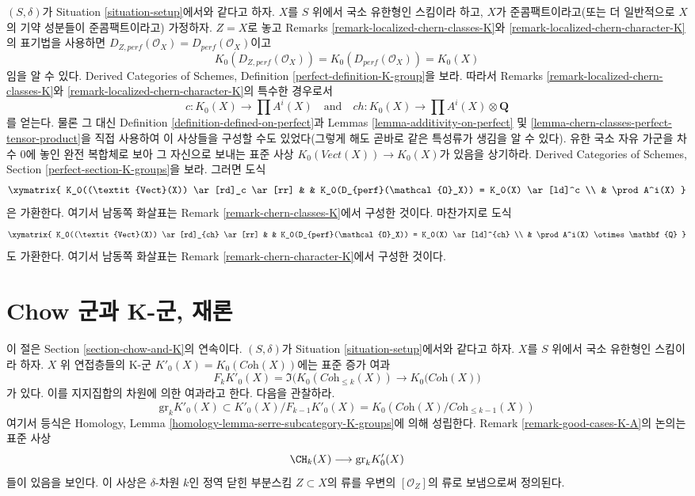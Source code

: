 \begin{remark}
\label{remark-chern-classes-agree}
$(S, \delta)$가 Situation \ref{situation-setup}에서와 같다고 하자.
$X$를 $S$ 위에서 국소 유한형인 스킴이라 하고, $X$가
준콤팩트이라고(또는 더 일반적으로 $X$의 기약 성분들이 준콤팩트이라고)
가정하자. $Z = X$로 놓고 Remarks
\ref{remark-localized-chern-classes-K}와
\ref{remark-localized-chern-character-K}의 표기법을 사용하면
$D_{Z, perf}(\mathcal{O}_X) = D_{perf}(\mathcal{O}_X)$이고
$$
K_0(D_{Z, perf}(\mathcal{O}_X)) = K_0(D_{perf}(\mathcal{O}_X)) = K_0(X)
$$
임을 알 수 있다. Derived Categories of Schemes, Definition
\ref{perfect-definition-K-group}을 보라. 따라서 Remarks
\ref{remark-localized-chern-classes-K}와
\ref{remark-localized-chern-character-K}의 특수한 경우로서
$$
c : K_0(X) \to \prod A^i(X)
\quad\text{and}\quad
ch : K_0(X) \to \prod A^i(X) \otimes \mathbf{Q}
$$
를 얻는다. 물론 그 대신 Definition
\ref{definition-defined-on-perfect}과 Lemmas
\ref{lemma-additivity-on-perfect} 및
\ref{lemma-chern-classes-perfect-tensor-product}을 직접 사용하여 이
사상들을 구성할 수도 있었다(그렇게 해도 곧바로 같은 특성류가
생김을 알 수 있다). 유한 국소 자유 가군을 차수 $0$에 놓인 완전
복합체로 보아 그 자신으로 보내는 표준 사상
$K_0(\textit{Vect}(X)) \to K_0(X)$가 있음을 상기하라. Derived Categories
of Schemes, Section \ref{perfect-section-K-groups}을 보라. 그러면 도식
$$
\xymatrix{
K_0((\textit{Vect}(X)) \ar[rd]_c \ar[rr] & &
K_0(D_{perf}(\mathcal{O}_X)) = K_0(X) \ar[ld]^c \\
& \prod A^i(X)
}
$$
은 가환한다. 여기서 남동쪽 화살표는 Remark
\ref{remark-chern-classes-K}에서 구성한 것이다. 마찬가지로 도식
$$
\xymatrix{
K_0((\textit{Vect}(X)) \ar[rd]_{ch} \ar[rr] & &
K_0(D_{perf}(\mathcal{O}_X)) = K_0(X) \ar[ld]^{ch} \\
& \prod A^i(X) \otimes \mathbf{Q}
}
$$
도 가환한다. 여기서 남동쪽 화살표는 Remark
\ref{remark-chern-character-K}에서 구성한 것이다.
\end{remark}











\section{Chow 군과 K-군, 재론}
\label{section-chow-and-K-II}

\noindent
이 절은 Section \ref{section-chow-and-K}의 연속이다.
$(S, \delta)$가 Situation \ref{situation-setup}에서와 같다고 하자.
$X$를 $S$ 위에서 국소 유한형인 스킴이라 하자. $X$ 위 연접층들의
K-군 $K'_0(X) = K_0(\textit{Coh}(X))$에는 표준 증가 여과
$$
F_kK'_0(X) =
\Im\Big(K_0(\textit{Coh}_{\leq k}(X)) \to K_0(\textit{Coh}(X)\Big)
$$
가 있다. 이를 지지집합의 차원에 의한 여과라고 한다. 다음을 관찰하라.
$$
\text{gr}_k K'_0(X) \subset K'_0(X)/F_{k - 1}K'_0(X) =
K_0(\textit{Coh}(X)/\textit{Coh}_{\leq k - 1}(X))
$$
여기서 등식은 Homology, Lemma
\ref{homology-lemma-serre-subcategory-K-groups}에 의해 성립한다.
Remark \ref{remark-good-cases-K-A}의 논의는 표준 사상
$$
\CH_k(X) \longrightarrow \text{gr}_k K'_0(X)
$$
들이 있음을 보인다. 이 사상은 $\delta$-차원 $k$인 정역 닫힌 부분스킴
$Z \subset X$의 류를 우변의 $[\mathcal{O}_Z]$의 류로 보냄으로써
정의된다.

